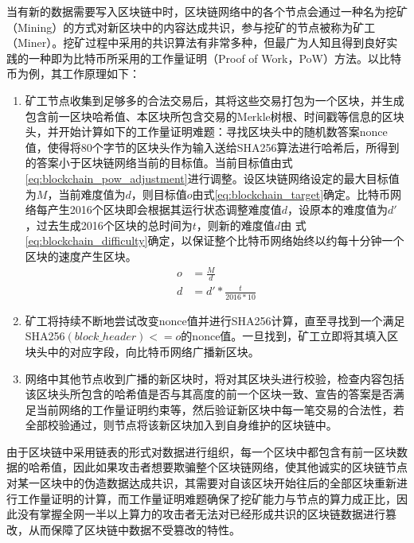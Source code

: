     当有新的数据需要写入区块链中时，区块链网络中的各个节点会通过一种名为挖矿（Mining）的方式对新区块中的内容达成共识，参与挖矿的节点被称为矿工（Miner）。挖矿过程中采用的共识算法有非常多种，但最广为人知且得到良好实践的一种即为比特币所采用的工作量证明（Proof of Work，PoW）方法。以比特币为例，其工作原理如下：
    \begin{enumerate}[1{)}]
      \item 矿工节点收集到足够多的合法交易后，其将这些交易打包为一个区块，并生成包含前一区块哈希值、本区块所包含交易的Merkle树根、时间戳等信息的区块头，并开始计算如下的工作量证明难题：寻找区块头中的随机数答案nonce值，使得将80个字节的区块头作为输入送给SHA256\cite{burrows1995secure}算法进行哈希后，所得到的答案小于区块链网络当前的目标值。当前目标值由式\eqref{eq:blockchain_pow_adjustment}进行调整。设区块链网络设定的最大目标值为$M$，当前难度值为$d$，则目标值$o$由式\eqref{eq:blockchain_target}确定。比特币网络每产生2016个区块即会根据其运行状态调整难度值$d$，设原本的难度值为$d'$，过去生成2016个区块的总时间为$t$，则新的难度值$d$由
      式\eqref{eq:blockchain_difficulty}确定，以保证整个比特币网络始终以约每十分钟一个区块的速度产生区块。
      \begin{subequations}
        \label{eq:blockchain_pow_adjustment}
        \begin{align}
          o &= \frac{M}{d} \label{eq:blockchain_target}  \\
          d &= d' * \frac{t}{2016*10} \label{eq:blockchain_difficulty}    
        \end{align}
      \end{subequations}
      \item 矿工将持续不断地尝试改变nonce值并进行SHA256计算，直至寻找到一个满足SHA256$(block\_header) <= o$的nonce值。一旦找到，矿工立即将其填入区块头中的对应字段，向比特币网络广播新区块。
      \item 网络中其他节点收到广播的新区块时，将对其区块头进行校验，检查内容包括该区块头所包含的哈希值是否与其高度的前一个区块一致、宣告的答案是否满足当前网络的工作量证明约束等，然后验证新区块中每一笔交易的合法性，若全部校验通过，则节点将该新区块加入到自身维护的区块链中。
    \end{enumerate}

    由于区块链中采用链表的形式对数据进行组织，每一个区块中都包含有前一区块数据的哈希值，因此如果攻击者想要欺骗整个区块链网络，使其他诚实的区块链节点对某一区块中的伪造数据达成共识，其需要对自该区块开始往后的全部区块重新进行工作量证明的计算，而工作量证明难题确保了挖矿能力与节点的算力成正比，因此没有掌握全网一半以上算力的攻击者无法对已经形成共识的区块链数据进行篡改，从而保障了区块链中数据不受篡改的特性。

